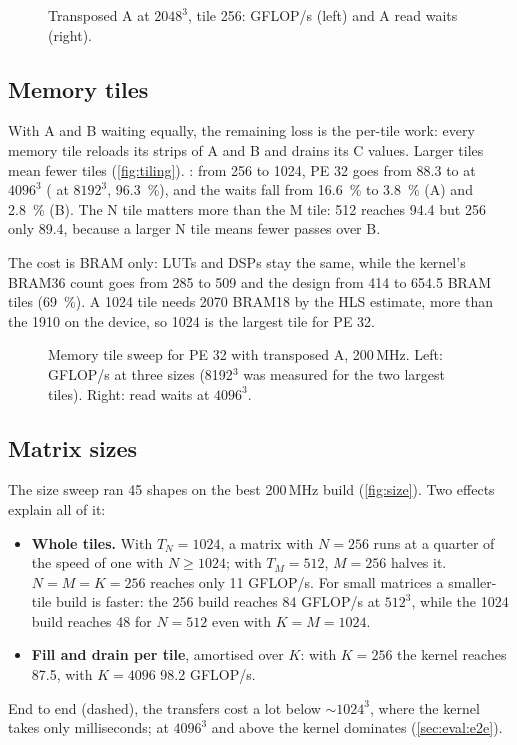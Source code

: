 \begin{figure}[ht]
  \centering
  
  \caption{Transposed A at \(2048^3\), tile 256: GFLOP/s (left) and A read waits (right).}
  \label{fig:transposed}
\end{figure}

\subsection{Memory tiles}
With A and B waiting equally, the remaining loss is the per-tile work: every memory tile reloads its strips of A and
B and drains its C values. Larger tiles mean fewer tiles (\cref{fig:tiling}). : from 256 to
1024, PE 32 goes from 88.3 to  at \(4096^3\) ( at \(8192^3\), \SI{96.3}{\percent}),
and the waits fall from \SI{16.6}{\percent} to \SI{3.8}{\percent} (A) and \SI{2.8}{\percent} (B). The N tile matters
more than the M tile: 512 reaches 94.4 but 256 only 89.4, because a larger N tile means fewer passes over B.

The cost is BRAM only: LUTs and DSPs stay the same, while the kernel's BRAM36 count goes from 285 to 509 and the
design from 414 to 654.5 BRAM tiles (\SI{69}{\percent}). A 1024 tile needs 2070 BRAM18 by the HLS estimate,
more than the 1910 on the device, so 1024 is the largest tile for PE 32.

\begin{figure}[ht]
  \centering
  
  \caption{Memory tile sweep for PE 32 with transposed A, 200\,MHz. Left: GFLOP/s at three sizes (8192\(^3\) was
    measured for the two largest tiles). Right: read waits at \(4096^3\).}
  \label{fig:tiles}
\end{figure}

\subsection{Matrix sizes}
\label{sec:eval:sizes}
The size sweep ran 45 shapes on the best 200\,MHz build (\cref{fig:size}). Two effects explain all of it:
\begin{itemize}
  \item \textbf{Whole tiles.} With \(T_N = 1024\), a matrix with \(N = 256\) runs at a quarter of the speed of one
        with \(N \ge 1024\); with \(T_M = 512\), \(M = 256\) halves it. \(N = M = K = 256\) reaches only 11
        GFLOP/s. For small matrices a smaller-tile build is faster: the 256 build reaches 84 GFLOP/s at
        \(512^3\), while the 1024 build reaches 48 for \(N = 512\) even with \(K = M = 1024\).
  \item \textbf{Fill and drain per tile}, amortised over \(K\): with \(K=256\) the kernel reaches 87.5, with
        \(K = 4096\) 98.2 GFLOP/s.
\end{itemize}
End to end (dashed), the transfers cost a lot below \(\sim\)\(1024^3\), where the kernel takes only milliseconds; at
\(4096^3\) and above the kernel dominates (\cref{sec:eval:e2e}).


